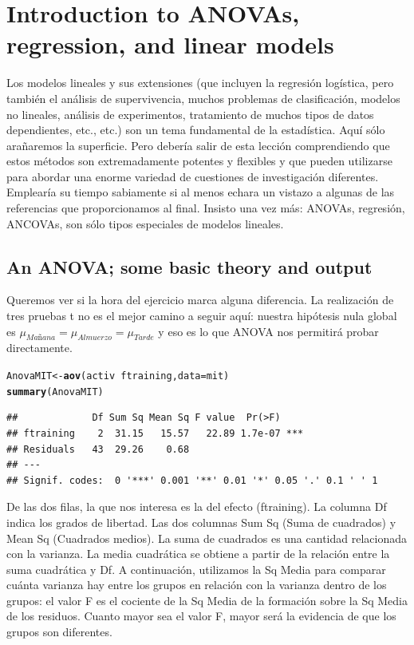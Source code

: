 \documentclass{config/apuntes}\usepackage[]{graphicx}\usepackage[]{xcolor}
\makeatletter
\newcommand{\hlopt}[1]{\textcolor[rgb]{0,0,0}{#1}}%
\newcommand{\hldef}[1]{\textcolor[rgb]{0.345,0.345,0.345}{#1}}%
\newcommand{\hlkwb}[1]{\textcolor[rgb]{0.69,0.353,0.396}{#1}}%
\newcommand{\hlkwc}[1]{\textcolor[rgb]{0.333,0.667,0.333}{#1}}%
\newcommand{\hlkwd}[1]{\textcolor[rgb]{0.737,0.353,0.396}{\textbf{#1}}}%
\newenvironment{kframe}{%
 \def\at@end@of@kframe{}%
 \ifinner\ifhmode%
  \def\at@end@of@kframe{\end{minipage}}%
  \begin{minipage}{\columnwidth}%
 \fi\fi%
 \def\FrameCommand##1{\hskip\@totalleftmargin \hskip-\fboxsep
 \colorbox{shadecolor}{##1}\hskip-\fboxsep
     \hskip-\linewidth \hskip-\@totalleftmargin \hskip\columnwidth}%
 \MakeFramed {\advance\hsize-\width
   \@totalleftmargin\z@ \linewidth\hsize
   \@setminipage}}%
 {\par\unskip\endMakeFramed%
 \at@end@of@kframe}
\newenvironment{knitrout}{}{} %
\makeatother
\begin{document}
\section{Introduction to ANOVAs, regression, and linear models}
Los modelos lineales y sus extensiones (que incluyen la regresión logística, pero también el análisis de supervivencia, muchos problemas de clasificación, modelos no lineales, análisis de experimentos, tratamiento de muchos tipos de datos dependientes, etc., etc.) son un tema fundamental de la estadística. Aquí sólo arañaremos la superficie. Pero debería salir de esta lección comprendiendo que estos métodos son extremadamente potentes y flexibles y que pueden utilizarse para abordar una enorme variedad de cuestiones de investigación diferentes. Emplearía su tiempo sabiamente si al menos echara un vistazo a algunas de las referencias que proporcionamos al final. Insisto una vez más: ANOVAs, regresión, ANCOVAs, son sólo tipos especiales de modelos lineales.

\subsection{An ANOVA; some basic theory and output}



Queremos ver si la hora del ejercicio marca alguna diferencia. La realización de tres pruebas t no es el mejor camino a seguir aquí: nuestra hipótesis nula global es $\mu_{Mañana} = \mu_{Almuerzo} = \mu_{Tarde}$ y eso es lo que ANOVA nos permitirá probar directamente.

\begin{knitrout}
\color{fgcolor}\begin{kframe}
\begin{alltt}
\hldef{AnovaMIT} \hlkwb{<-} \hlkwd{aov}\hldef{(activ} \hlopt{~} \hldef{ftraining,} \hlkwc{data} \hldef{= mit)}
\hlkwd{summary}\hldef{(AnovaMIT)}
\end{alltt}
\begin{verbatim}
##             Df Sum Sq Mean Sq F value  Pr(>F)    
## ftraining    2  31.15   15.57   22.89 1.7e-07 ***
## Residuals   43  29.26    0.68                    
## ---
## Signif. codes:  0 '***' 0.001 '**' 0.01 '*' 0.05 '.' 0.1 ' ' 1
\end{verbatim}
\end{kframe}
\end{knitrout}

De las dos filas, la que nos interesa es la del efecto (ftraining). La columna Df indica los grados de libertad. Las dos columnas Sum Sq (Suma de cuadrados) y Mean Sq (Cuadrados medios). La suma de cuadrados es una cantidad relacionada con la varianza. La media cuadrática se obtiene a partir de la relación entre la suma cuadrática y Df. A continuación, utilizamos la Sq Media para comparar cuánta varianza hay entre los grupos en relación con la varianza dentro de los grupos: el valor F es el cociente de la Sq Media de la formación sobre la Sq Media de los residuos. Cuanto mayor sea el valor F, mayor será la evidencia de que los grupos son diferentes.
\end{document}
